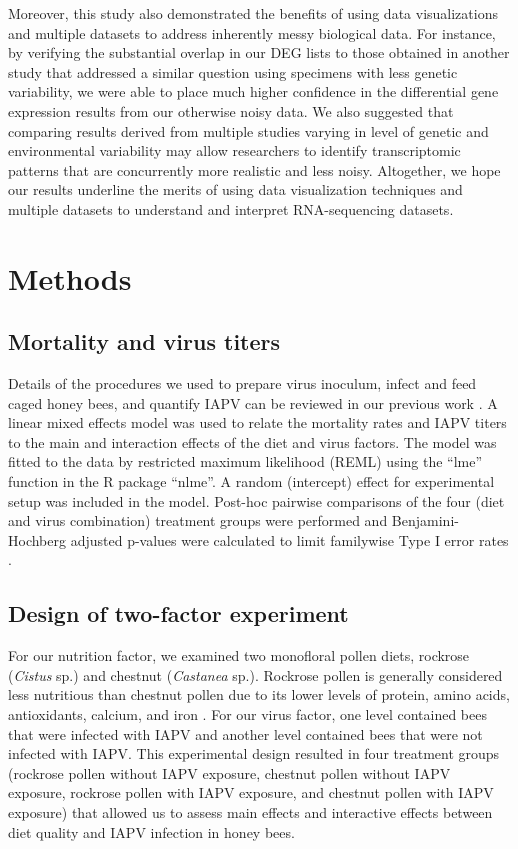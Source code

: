 \documentclass{bmcart}
\begin{document}
\begin{linenumbers}
\begin{doublespacing}
Moreover, this study also demonstrated the benefits of using data visualizations and multiple datasets to address inherently messy biological data. For instance, by verifying the substantial overlap in our DEG lists to those obtained in another study that addressed a similar question using specimens with less genetic variability, we were able to place much higher confidence in the differential gene expression results from our otherwise noisy data. We also suggested that comparing results derived from multiple studies varying in level of genetic and environmental variability may allow researchers to identify transcriptomic patterns that are concurrently more realistic and less noisy. Altogether, we hope our results underline the merits of using data visualization techniques and multiple datasets to understand and interpret RNA-sequencing datasets.

\section*{Methods}

\subsection*{Mortality and virus titers}

Details of the procedures we used to prepare virus inoculum, infect and feed caged honey bees, and quantify IAPV can be reviewed in our previous work \cite{adamInt, carrillo}. A linear mixed effects model was used to relate the mortality rates and IAPV titers to the main and interaction effects of the diet and virus factors. The model was fitted to the data by restricted maximum likelihood (REML) using the ``lme'' function in the R package ``nlme''. A random (intercept) effect for experimental setup was included in the model. Post-hoc pairwise comparisons of the four (diet and virus combination) treatment groups were performed and Benjamini-Hochberg adjusted p-values were calculated to limit familywise Type I error rates \cite{bh}.

\subsection*{Design of two-factor experiment}

For our nutrition factor, we examined two monofloral pollen diets, rockrose (\textit{Cistus} sp.) and chestnut (\textit{Castanea} sp.). Rockrose pollen is generally considered less nutritious than chestnut pollen due to its lower levels of protein, amino acids, antioxidants, calcium, and iron \cite{adamInt, DiPasquale}. For our virus factor, one level contained bees that were infected with IAPV and another level contained bees that were not infected with IAPV. This experimental design resulted in four treatment groups (rockrose pollen without IAPV exposure, chestnut pollen without IAPV exposure, rockrose pollen with IAPV exposure, and chestnut pollen with IAPV exposure) that allowed us to assess main effects and interactive effects between diet quality and IAPV infection in honey bees.


\end{doublespacing}
\end{linenumbers}
\end{document}
